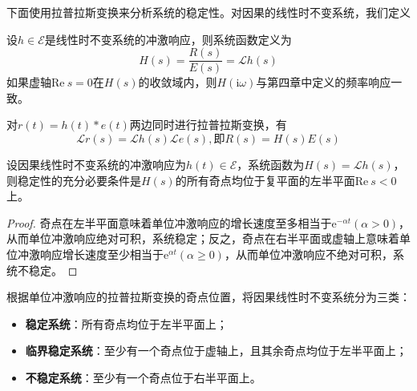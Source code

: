 下面使用拉普拉斯变换来分析系统的稳定性。对因果的线性时不变系统，我们定义
\begin{definition}[系统函数]
    设$h\in\mathcal{E} $是线性时不变系统的冲激响应，则系统函数定义为
    $$H(s)=\frac{R(s)}{E(s)}=\mathcal{L} h(s)$$
    如果虚轴$\text{Re}\ s=0$在$H(s)$的收敛域内，则$H(\mathrm{i}\omega)$与第四章中定义的频率响应一致。
\end{definition}
对$r(t)=h(t)*e(t)$两边同时进行拉普拉斯变换，有
\[\mathcal{L} r(s)=\mathcal{L} h(s)\mathcal{L} e(s),\text{即}R(s)=H(s)E(s)\]

\begin{proposition}[稳定性的复频域判则]
    设因果线性时不变系统的冲激响应为$h(t)\in\mathcal{E}$，系统函数为$H(s)=\mathcal{L} h(s)$，则稳定性的充分必要条件是$H(s)$的所有奇点均位于复平面的左半平面$\text{Re}\ s<0$上。
\end{proposition}
\begin{proof}
    奇点在左半平面意味着单位冲激响应的增长速度至多相当于$\mathrm{e}^{-\alpha t}( \alpha>0)$，从而单位冲激响应绝对可积，系统稳定；反之，奇点在右半平面或虚轴上意味着单位冲激响应增长速度至少相当于$\mathrm{e}^{\alpha t}(\alpha\geq0)$，从而单位冲激响应不绝对可积，系统不稳定。
\end{proof}
\begin{definition}
    根据单位冲激响应的拉普拉斯变换的奇点位置，将因果线性时不变系统分为三类：
    \begin{itemize}
        \item \textbf{稳定系统}：所有奇点均位于左半平面上；
        \item \textbf{临界稳定系统}：至少有一个奇点位于虚轴上，且其余奇点均位于左半平面上；
        \item \textbf{不稳定系统}：至少有一个奇点位于右半平面上。
    \end{itemize}
\end{definition}

